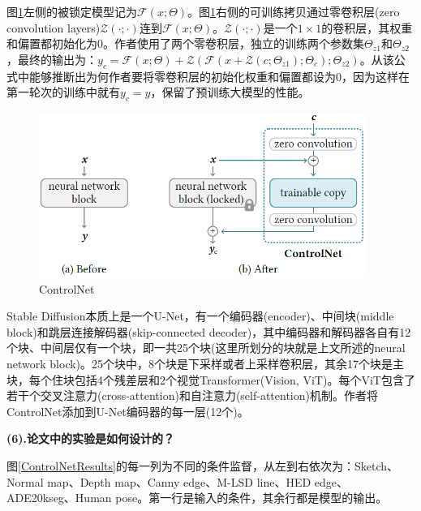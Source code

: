 \documentclass[12pt, a4paper, oneside]{ctexart}
\begin{document}
    图\ref{ControlNet}左侧的被锁定模型记为$\mathcal{F}(x;\Theta)$。图\ref{ControlNet}右侧的可训练拷贝通过零卷积层(zero convolution layers)$\mathcal{Z}(\cdot;\cdot)$连到$\mathcal{F}(x;\Theta)$。$\mathcal{Z}(\cdot;\cdot)$是一个$1\times1$的卷积层，其权重和偏置都初始化为$0$。作者使用了两个零卷积层，独立的训练两个参数集$\Theta_{z1}$和$\Theta_{z2}$，最终的输出为：$y_c=\mathcal{F}(x;\Theta)+\mathcal{Z}(\mathcal{F}(x+\mathcal{Z}(c;\Theta_{z1});\Theta_c);\Theta_{z2})$。从该公式中能够推断出为何作者要将零卷积层的初始化权重和偏置都设为$0$，因为这样在第一轮次的训练中就有$y_c = y$，保留了预训练大模型的性能。

    \begin{figure}[htbp]
        \centering
        \includegraphics[width=0.95\textwidth]{pic/4.10_ControlNet.png}
        \caption{ControlNet}
        \label{ControlNet}
    \end{figure}


    Stable Diffusion本质上是一个U-Net，有一个编码器(encoder)、中间块(middle block)和跳层连接解码器(skip-connected decoder)，其中编码器和解码器各自有12个块、中间层仅有一个块，即一共25个块(这里所划分的块就是上文所述的neural network block)。25个块中，8个块是下采样或者上采样卷积层，其余17个块是主块，每个住块包括4个残差层和2个视觉Transformer(Vision, ViT)。每个ViT包含了若干个交叉注意力(cross-attention)和自注意力(self-attention)机制。作者将ControlNet添加到U-Net编码器的每一层(12个)。

    \noindent\textbf{(6).论文中的实验是如何设计的？}


    图\ref{ControlNetResults}的每一列为不同的条件监督，从左到右依次为：Sketch、Normal map、Depth map、Canny edge、M-LSD line、HED edge、ADE20kseg、Human pose。第一行是输入的条件，其余行都是模型的输出。
\end{document}
